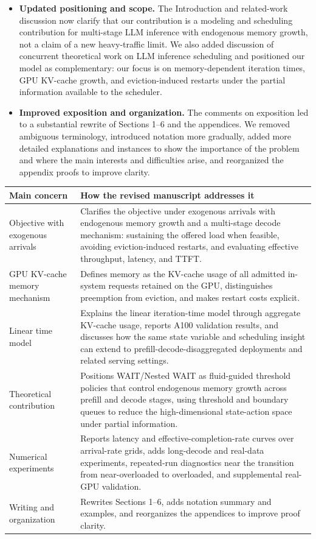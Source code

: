 \begin{itemize}
    \item \textbf{Updated positioning and scope.} The Introduction and related-work discussion now clarify that our contribution is a modeling and scheduling contribution for multi-stage LLM inference with endogenous memory growth, not a claim of a new heavy-traffic limit. We also added discussion of concurrent theoretical work on LLM inference scheduling and positioned our model as complementary: our focus is on memory-dependent iteration times, GPU KV-cache growth, and eviction-induced restarts under the partial information available to the scheduler.
    \item \textbf{Improved exposition and organization.} The comments on exposition led to a substantial rewrite of Sections 1--6 and the appendices. We removed ambiguous terminology, introduced notation more gradually, added more detailed explanations and instances to show the importance of the problem and where the main interests and difficulties arise, and reorganized the appendix proofs to improve clarity.
\end{itemize}

\begin{center}
\begin{tabularx}{0.96\textwidth}{@{}p{}X@{}}
\toprule
\textbf{Main concern} & \textbf{How the revised manuscript addresses it} \\
\midrule
Objective with exogenous arrivals & Clarifies the objective under exogenous arrivals with endogenous memory growth and a multi-stage decode mechanism: sustaining the offered load when feasible, avoiding eviction-induced restarts, and evaluating effective throughput, latency, and TTFT. \\
GPU KV-cache memory mechanism & Defines memory as the KV-cache usage of all admitted in-system requests retained on the GPU, distinguishes preemption from eviction, and makes restart costs explicit. \\
Linear time model & Explains the linear iteration-time model through aggregate KV-cache usage, reports A100 validation results, and discusses how the same state variable and scheduling insight can extend to prefill-decode-disaggregated deployments and related serving settings. \\
Theoretical contribution & Positions WAIT/Nested WAIT as fluid-guided threshold policies that control endogenous memory growth across prefill and decode stages, using threshold and boundary queues to reduce the high-dimensional state-action space under partial information. \\
Numerical experiments & Reports latency and effective-completion-rate curves over arrival-rate grids, adds long-decode and real-data experiments, repeated-run diagnostics near the transition from near-overloaded to overloaded, and supplemental real-GPU validation. \\
Writing and organization & Rewrites Sections 1--6, adds notation summary and examples, and reorganizes the appendices to improve proof clarity. \\
\bottomrule
\end{tabularx}
\end{center}

